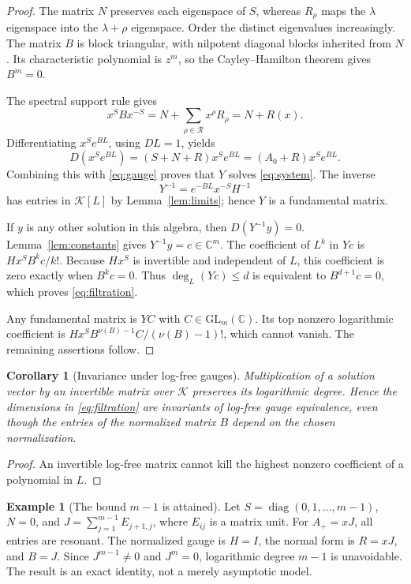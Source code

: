 \documentclass[11pt,a4paper]{article}
\numberwithin{equation}{section}
\newtheorem{corollary}[theorem]{Corollary}
\theoremstyle{definition}
\newtheorem{example}[theorem]{Example}
\theoremstyle{remark}
\newcommand{\C}{\mathbb C}
\newcommand{\K}{\mathcal K}
\newcommand{\Res}{\mathcal R}
\newcommand{\diag}{\operatorname{diag}}
\newcommand{\Aplus}{A_{+}}
\begin{document}
\begin{proof}
The matrix $N$ preserves each eigenspace of $S$, whereas $R_\rho$ maps
the $\lambda$ eigenspace into the $\lambda+\rho$ eigenspace. Order the
distinct eigenvalues increasingly. The matrix $B$ is block triangular,
with nilpotent diagonal blocks inherited from $N$. Its characteristic
polynomial is $z^m$, so the Cayley--Hamilton theorem gives $B^m=0$.

The spectral support rule gives
\begin{equation}\label{eq:conjugateB}
 x^S Bx^{-S}=N+\sum_{\rho\in\Res}x^\rho R_\rho=N+R(x).
\end{equation}
Differentiating $x^S e^{BL}$, using $DL=1$, yields
\[
 D(x^S e^{BL})=(S+N+R)x^S e^{BL}=(A_0+R)x^S e^{BL}.
\]
Combining this with \eqref{eq:gauge} proves that $Y$ solves
\eqref{eq:system}. The inverse
\[
 Y^{-1}=e^{-BL}x^{-S}H^{-1}
\]
has entries in $\K[L]$ by Lemma~\ref{lem:limits}; hence $Y$ is a
fundamental matrix.

If $y$ is any other solution in this algebra, then
$D(Y^{-1}y)=0$. Lemma~\ref{lem:constants} gives $Y^{-1}y=c\in\C^m$.
The coefficient of $L^k$ in $Yc$ is $Hx^SB^kc/k!$. Because $Hx^S$ is
invertible and independent of $L$, this coefficient is zero exactly when
$B^kc=0$. Thus $\deg_L(Yc)\leq d$ is equivalent to $B^{d+1}c=0$,
which proves \eqref{eq:filtration}.

Any fundamental matrix is $YC$ with $C\in\mathrm{GL}_m(\C)$. Its top
nonzero logarithmic coefficient is
$Hx^SB^{\nu(B)-1}C/(\nu(B)-1)!$, which cannot vanish. The remaining
assertions follow.
\end{proof}

\begin{corollary}[Invariance under log-free gauges]
Multiplication of a solution vector by an invertible matrix over $\K$
preserves its logarithmic degree. Hence the dimensions in
\eqref{eq:filtration} are invariants of log-free gauge equivalence, even
though the entries of the normalized matrix $B$ depend on the chosen
normalization.
\end{corollary}
\begin{proof}
An invertible log-free matrix cannot kill the highest nonzero coefficient
of a polynomial in $L$.
\end{proof}

\begin{example}[The bound $m-1$ is attained]\label{ex:chain}
Let $S=\diag(0,1,\ldots,m-1)$, $N=0$, and
$J=\sum_{j=1}^{m-1}E_{j+1,j}$, where $E_{ij}$ is a matrix unit.
For $\Aplus=xJ$, all entries are resonant. The normalized gauge is
$H=I$, the normal form is $R=xJ$, and $B=J$. Since
$J^{m-1}\ne0$ and $J^m=0$, logarithmic degree $m-1$ is unavoidable.
The result is an exact identity, not a merely asymptotic model.
\end{example}
\end{document}
